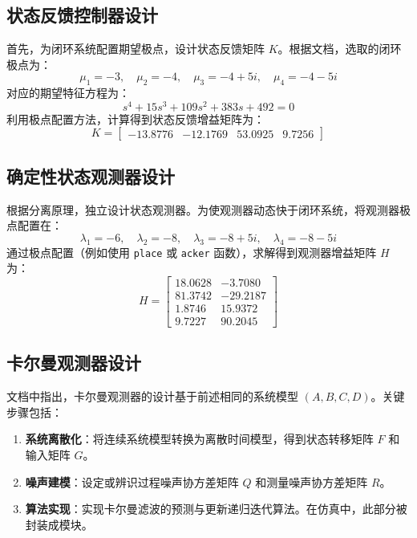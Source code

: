 \documentclass[a4paper, 12pt]{ctexart}
\begin{document}
\subsection{状态反馈控制器设计}
首先，为闭环系统配置期望极点，设计状态反馈矩阵 $K$。根据文档，选取的闭环极点为：
\begin{equation}
    \mu_1 = -3, \quad \mu_2 = -4, \quad \mu_3 = -4+5i, \quad \mu_4 = -4-5i
\end{equation}
对应的期望特征方程为：
\begin{equation}
    s^4 + 15s^3 + 109s^2 + 383s + 492 = 0
\end{equation}
利用极点配置方法，计算得到状态反馈增益矩阵为：
\begin{equation}
    K = \begin{bmatrix} -13.8776 & -12.1769 & 53.0925 & 9.7256 \end{bmatrix}
\end{equation}

\subsection{确定性状态观测器设计}
根据分离原理，独立设计状态观测器。为使观测器动态快于闭环系统，将观测器极点配置在：
\begin{equation}
    \lambda_1 = -6, \quad \lambda_2 = -8, \quad \lambda_3 = -8+5i, \quad \lambda_4 = -8-5i
\end{equation}
通过极点配置（例如使用 \texttt{place} 或 \texttt{acker} 函数），求解得到观测器增益矩阵 $H$ 为：
\begin{equation}
    H = \begin{bmatrix}
    18.0628 & -3.7080 \\
    81.3742 & -29.2187 \\
    1.8746 & 15.9372 \\
    9.7227 & 90.2045
    \end{bmatrix}
\end{equation}

\subsection{卡尔曼观测器设计}
文档中指出，卡尔曼观测器的设计基于前述相同的系统模型 $(A, B, C, D)$。关键步骤包括：
\begin{enumerate}
    \item \textbf{系统离散化}：将连续系统模型转换为离散时间模型，得到状态转移矩阵 $F$ 和输入矩阵 $G$。
    \item \textbf{噪声建模}：设定或辨识过程噪声协方差矩阵 $Q$ 和测量噪声协方差矩阵 $R$。
    \item \textbf{算法实现}：实现卡尔曼滤波的预测与更新递归迭代算法。在仿真中，此部分被封装成模块。
\end{enumerate}
\end{document}

